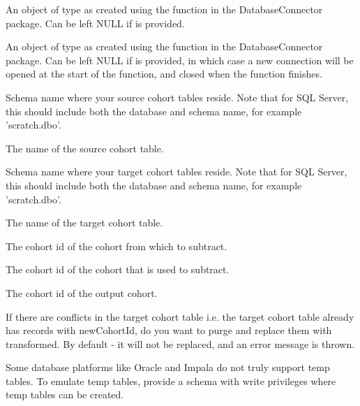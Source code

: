 \documentclass[a4paper]{book}
\begin{document}
\begin{Arguments}
\begin{ldescription}
\item[\code{connectionDetails}] An object of type  as created using the
 function in the
DatabaseConnector package. Can be left NULL if  is
provided.

\item[\code{connection}] An object of type  as created using the
 function in the
DatabaseConnector package. Can be left NULL if 
is provided, in which case a new connection will be opened at the start
of the function, and closed when the function finishes.

\item[\code{sourceCohortDatabaseSchema}] Schema name where your source cohort tables reside. Note that for SQL Server,
this should include both the database and schema name, for example
'scratch.dbo'.

\item[\code{sourceCohortTable}] The name of the source cohort table.

\item[\code{targetCohortDatabaseSchema}] Schema name where your target cohort tables reside. Note that for SQL Server,
this should include both the database and schema name, for example
'scratch.dbo'.

\item[\code{targetCohortTable}] The name of the target cohort table.

\item[\code{firstCohortId}] The cohort id of the cohort from which to subtract.

\item[\code{secondCohortId}] The cohort id of the cohort that is used to subtract.

\item[\code{newCohortId}] The cohort id of the output cohort.

\item[\code{purgeConflicts}] If there are conflicts in the target cohort table i.e. the target cohort table
already has records with newCohortId, do you want to purge and replace them
with transformed. By default - it will not be replaced, and an error message is thrown.

\item[\code{tempEmulationSchema}] Some database platforms like Oracle and Impala do not truly support
temp tables. To emulate temp tables, provide a schema with write
privileges where temp tables can be created.
\end{ldescription}
\end{Arguments}
\end{document}
